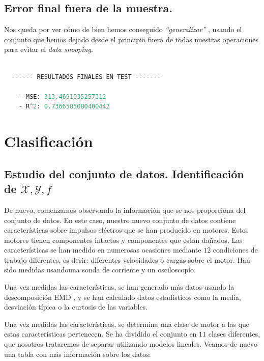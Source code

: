 \documentclass[a4paper, 20pt]{article}
\begin{document}
\subsection{Error final fuera de la muestra.}

Nos queda por ver cómo de bien hemos conseguido \emph{``generalizar''} , usando el conjunto que hemos dejado desde el principio fuera de todas nuestras operaciones para evitar el \emph{data snooping}.



\begin{lstlisting}[language=Python]

  ------ RESULTADOS FINALES EN TEST -------

	- MSE: 313.4691035257312
	- R^2: 0.7366585080400442 

\end{lstlisting}



\newpage

\section{Clasificación}

\subsection{Estudio del conjunto de datos. Identificación de $\mathcal X, \mathcal Y, f$}

De nuevo, comenzamos observando la información que se nos proporciona del conjunto de datos. En este caso, nuestro nuevo conjunto de datos \cite{noauthor_uci_nodate} contiene características sobre impulsos eléctros que se han producido en motores. Estos motores tienen componentes intactos y componentes que están dañados. Las características se han medido en numerosas ocasiones mediante $12$ condiciones de trabajo diferentes, es decir: diferentes velocidades o cargas sobre el motor. Han sido medidas usandouna sonda de corriente y un osciloscopio.

Una vez medidas las características, se han generado más datos usando la descomposición EMD \cite{noauthor_hilberthuang_2021}, y se han calculado datos estadísticos como la media, desviación típica o la curtosis de las variables.

Una vez medidas las características, se determina una clase de motor a las que estas características pertenecen. Se ha dividido el conjunto en $11$ clases diferentes, que nosotros trataremos de separar utilizando modelos lineales. Veamos de nuevo una tabla con más información sobre los datos:
\end{document}
